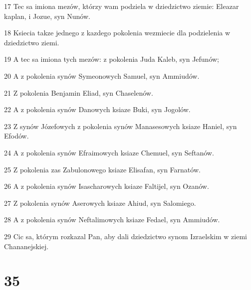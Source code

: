 \par 17 Tec sa imiona mezów, którzy wam podziela w dziedzictwo ziemie: Eleazar kaplan, i Jozue, syn Nunów.
\par 18 Ksiecia takze jednego z kazdego pokolenia wezmiecie dla podzielenia w dziedzictwo ziemi.
\par 19 A tec sa imiona tych mezów: z pokolenia Juda Kaleb, syn Jefunów;
\par 20 A z pokolenia synów Symeonowych Samuel, syn Ammiudów.
\par 21 Z pokolenia Benjamin Eliad, syn Chaselenów.
\par 22 A z pokolenia synów Danowych ksiaze Buki, syn Jogolów.
\par 23 Z synów Józefowych z pokolenia synów Manasesowych ksiaze Haniel, syn Efodów.
\par 24 A z pokolenia synów Efraimowych ksiaze Chemuel, syn Seftanów.
\par 25 Z pokolenia zas Zabulonowego ksiaze Elisafan, syn Farnatów.
\par 26 A z pokolenia synów Isascharowych ksiaze Faltijel, syn Ozanów.
\par 27 Z pokolenia synów Aserowych ksiaze Ahiud, syn Salomiego.
\par 28 A z pokolenia synów Neftalimowych ksiaze Fedael, syn Ammiudów.
\par 29 Cic sa, którym rozkazal Pan, aby dali dziedzictwo synom Izraelskim w ziemi Chananejskiej.

\chapter{35}

